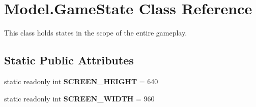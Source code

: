 \hypertarget{class_model_1_1_game_state}{}\section{Model.\+Game\+State Class Reference}
\label{class_model_1_1_game_state}


This class holds states in the scope of the entire gameplay.  


\subsection*{Static Public Attributes}
\begin{DoxyCompactItemize}
\item 
\hypertarget{class_model_1_1_game_state_a4ca2649ffbcf39f72b5373889fc87137}{}\label{class_model_1_1_game_state_a4ca2649ffbcf39f72b5373889fc87137} 
static readonly int {\bfseries S\+C\+R\+E\+E\+N\+\_\+\+H\+E\+I\+G\+HT} = 640
\item 
\hypertarget{class_model_1_1_game_state_ad3b13fdcad1e5b05176da2f3d554fa20}{}\label{class_model_1_1_game_state_ad3b13fdcad1e5b05176da2f3d554fa20} 
static readonly int {\bfseries S\+C\+R\+E\+E\+N\+\_\+\+W\+I\+D\+TH} = 960
\end{DoxyCompactItemize}

